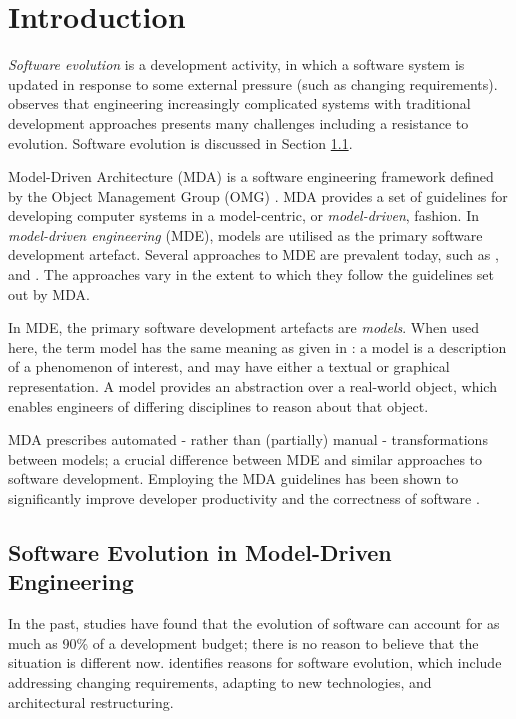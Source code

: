 \section{Introduction}
\textit{Software evolution} is a development activity, in which a software system is updated in response to some external pressure (such as changing requirements). \cite{brooks86nosilverbullet} observes that engineering increasingly complicated systems with traditional development approaches presents many challenges including a resistance to evolution. Software evolution is discussed in Section \ref{sub:software_evo}.

Model-Driven Architecture (MDA) is a software engineering framework defined by the Object Management
Group (OMG) \cite{omg}. MDA provides a set of guidelines for developing computer systems in a model-centric, or \textit{model-driven}, fashion. In \textit{model-driven engineering} (MDE), models are utilised as the primary software development artefact. Several approaches to MDE are prevalent today, such as \cite{stahl06mdsd}, \cite{kelly08dsm} and \cite{greenfield04software}. The approaches vary in the extent to which they follow the guidelines set out by MDA.

In MDE, the primary software development artefacts are \textit{models}. When used here, the term model has the same meaning as given in \cite{kolovos06eol}: a model is a description of a phenomenon of interest, and may have either a textual or graphical representation. A model provides an abstraction over a real-world object, which enables engineers of differing disciplines to reason about that object.

MDA prescribes automated - rather than (partially) manual - transformations between models; a crucial difference between MDE and similar approaches to software development. Employing the MDA guidelines has been shown to significantly improve developer productivity and the correctness of software \cite{watson08mdahistory}.

\subsection{Software Evolution in Model-Driven Engineering}
\label{sub:software_evo}
In the past, studies \cite{erlikh00leveraging,moad90maintaining} have found that the evolution of software can account for as much as 90\% of a development budget; there is no reason to believe that the situation is different now. \cite{sjoberg93quantifying} identifies reasons for software evolution, which include addressing changing requirements, adapting to new technologies, and architectural restructuring.

